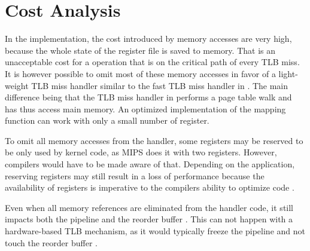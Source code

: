 


\section{Cost Analysis}
In the implementation, the cost introduced by memory accesses are very high, because the whole state of the register file is saved to memory. That is an unacceptable cost for a operation that is on the critical path of every TLB miss. It is however possible to omit most of these memory accesses in favor of a light-weight TLB miss handler similar to the fast TLB miss handler in \cite{heiserAnatomyHighPerformanceMicrokernel}. The main difference being that the TLB miss handler in \cite{heiserAnatomyHighPerformanceMicrokernel} performs a page table walk and has thus access main memory. An optimized implementation of the mapping function can work with only a small number of register.

To omit all memory accesses from the handler, some registers may be reserved to be only used by kernel code, as MIPS does it with two registers. However, compilers would have to be made aware of that. Depending on the application, reserving registers may still result in a loss of performance because the availability of registers is imperative to the compilers ability to optimize code \cite{elphinstone2013l3}.

Even when all memory references are eliminated from the handler code, it still impacts both the pipeline and the reorder buffer \cite{jacobSoftwaremanagedAddressTranslation1997}. This can not happen with a hardware-based TLB mechanism, as it would typically freeze the pipeline and not touch the reorder buffer \cite{bhattacharjee2017architectural}.




